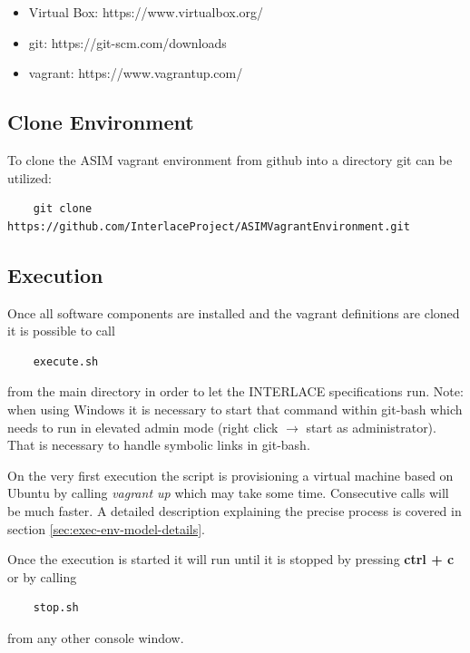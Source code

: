 \begin{itemize}
	\item Virtual Box: https://www.virtualbox.org/
	\item git: https://git-scm.com/downloads
	\item vagrant: https://www.vagrantup.com/
\end{itemize}

\subsection{Clone Environment}

To clone the ASIM vagrant environment from github into a directory git can be utilized:

\begin{lstlisting}
	git clone https://github.com/InterlaceProject/ASIMVagrantEnvironment.git
\end{lstlisting}

\subsection{Execution}

Once all software components are installed and the vagrant definitions are cloned it is possible to call

\begin{lstlisting}
	execute.sh
\end{lstlisting}

from the main directory in order to let the INTERLACE specifications run. Note: when using Windows it is necessary to start that command within git-bash which needs to run in elevated admin mode (right click $\rightarrow$ start as administrator). That is necessary to handle symbolic links in git-bash.

On the very first execution the script is provisioning a virtual machine based on Ubuntu by calling \textit{vagrant up} which may take some time. Consecutive calls will be much faster. A detailed description explaining the precise process is covered in section \ref{sec:exec-env-model-details}.

Once the execution is started it will run until it is stopped by pressing \textbf{ctrl + c} or by calling

\begin{lstlisting}
	stop.sh
\end{lstlisting}

from any other console window.

